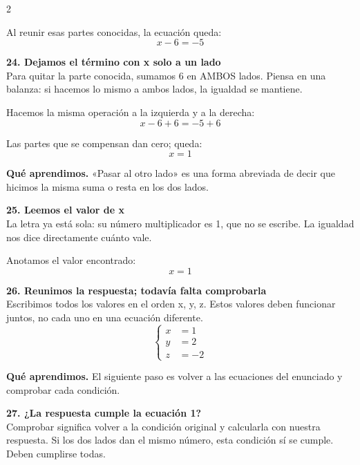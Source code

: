 \documentclass[11pt,a4paper,landscape]{article}
\begin{document}
\begin{multicols*}{2}
\begin{minipage}{\linewidth}
\par\smallskip Al reunir esas partes conocidas, la ecuación queda:
\[x - 6=-5\]
\end{minipage}\par\medskip
\noindent\begin{minipage}{\linewidth}\textbf{24. Dejamos el término con x solo a un lado}\\[2pt]Para quitar la parte conocida, sumamos 6 en AMBOS lados. Piensa en una balanza: si hacemos lo mismo a ambos lados, la igualdad se mantiene.
\par\smallskip Hacemos la misma operación a la izquierda y a la derecha:
\[x - 6 + 6=-5 + 6\]
\par\smallskip Las partes que se compensan dan cero; queda:
\[x=1\]
\par\smallskip\textbf{Qué aprendimos.} «Pasar al otro lado» es una forma abreviada de decir que hicimos la misma suma o resta en los dos lados.
\end{minipage}\par\medskip
\noindent\begin{minipage}{\linewidth}\textbf{25. Leemos el valor de x}\\[2pt]La letra ya está sola: su número multiplicador es 1, que no se escribe. La igualdad nos dice directamente cuánto vale.
\par\smallskip Anotamos el valor encontrado:
\[x=1\]
\end{minipage}\par\medskip
\noindent\begin{minipage}{\linewidth}\textbf{26. Reunimos la respuesta; todavía falta comprobarla}\\[2pt]Escribimos todos los valores en el orden x, y, z. Estos valores deben funcionar juntos, no cada uno en una ecuación diferente.
\[\left\{\begin{aligned}x&=1\\y&=2\\z&=-2\end{aligned}\right.\]
\par\smallskip\textbf{Qué aprendimos.} El siguiente paso es volver a las ecuaciones del enunciado y comprobar cada condición.
\end{minipage}\par\medskip
\noindent\begin{minipage}{\linewidth}\textbf{27. ¿La respuesta cumple la ecuación 1?}\\[2pt]Comprobar significa volver a la condición original y calcularla con nuestra respuesta. Si los dos lados dan el mismo número, esta condición sí se cumple. Deben cumplirse todas.

\end{minipage}
\end{multicols*}
\end{document}
